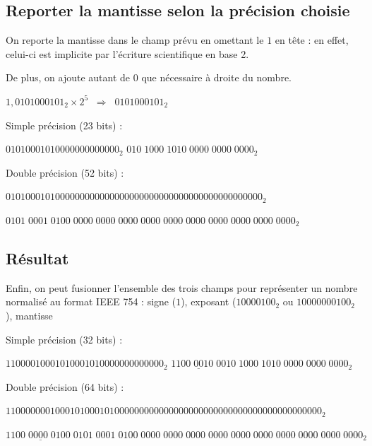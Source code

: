 \documentclass[11pt,a4paper]{article}
\begin{document}
\bigskip

\subsection{Reporter la mantisse selon la précision choisie}

\medskip

On reporte la mantisse dans le champ prévu en omettant le $ 1 $ en tête : en effet, celui-ci est implicite par l'écriture scientifique en base 2.

De plus, on ajoute autant de $ 0 $ que nécessaire à droite du nombre.

\medskip

$ 1,0101000101_{2} \times 2^{5}  \; \; \Rightarrow \; \;  0101000101_{2} $

\medskip

Simple précision (23 bits) :

$ 0101 0001 0100 0000 0000 000_{2} $  \hfill  $ 010 \; 1000 \; 1010 \; 0000 \; 0000 \; 0000_{2} $  \hfill \phantom{Texte.}

\medskip

Double précision (52 bits) :

$ 0101 0001 0100 0000 0000 0000 0000 0000 0000 0000 0000 0000 0000_{2} $

$ 0101 \; 0001 \; 0100 \; 0000 \; 0000 \; 0000 \; 0000 \; 0000 \; 0000 \; 0000 \; 0000 \; 0000 \; 0000_{2} $

\bigskip

\subsection{Résultat}

\bigskip

Enfin, on peut fusionner l'ensemble des trois champs pour représenter un nombre normalisé au format IEEE 754 : signe ($ 1 $), exposant ($ 1000 0100_{2} $ ou $ 100 0000 0100_{2} $), mantisse

\medskip


Simple précision (32 bits) :

$ 1 1000 0100 0101 0001 0100 0000 0000 000_{2} $  \hfill  $ 1\underline{100 \; 0010 \; 0}010 \; 1000 \; 1010 \; 0000 \; 0000 \; 0000_{2} $

\medskip

Double précision (64 bits) :

$ 1 100 0000 0100 0101 0001 0100 0000 0000 0000 0000 0000 0000 0000 0000 0000 0000_{2} $

$ 1\underline{100 \; 0000 \; 0100} \; 0101 \; 0001 \; 0100 \; 0000 \; 0000 \; 0000 \; 0000 \; 0000 \; 0000 \; 0000 \; 0000 \; 0000 \; 0000_{2} $
\end{document}
